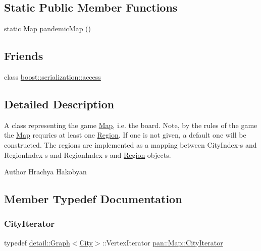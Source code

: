 \subsection*{Static Public Member Functions}
\begin{DoxyCompactItemize}
\item 
static \hyperlink{classpan_1_1_map}{Map} \hyperlink{classpan_1_1_map_afc16b42064eca43b341cd4a555bed092}{pandemic\+Map} ()
\end{DoxyCompactItemize}
\subsection*{Friends}
\begin{DoxyCompactItemize}
\item 
class \hyperlink{classpan_1_1_map_ac98d07dd8f7b70e16ccb9a01abf56b9c}{boost\+::serialization\+::access}
\end{DoxyCompactItemize}


\subsection{Detailed Description}
A class representing the game \hyperlink{classpan_1_1_map}{Map}, i.\+e. the board. Note, by the rules of the game the \hyperlink{classpan_1_1_map}{Map} requries at least one \hyperlink{classpan_1_1_region}{Region}. If one is not given, a default one will be constructed. The regions are implemented as a mapping between City\+Index-\/s and Region\+Index-\/s and Region\+Index-\/s and \hyperlink{classpan_1_1_region}{Region} objects. 

\begin{DoxyAuthor}{Author}
Hrachya Hakobyan 
\end{DoxyAuthor}


\subsection{Member Typedef Documentation}
\mbox{\label{classpan_1_1_map_a13baf12f486c6c3b823696266f06202c}} 
\subsubsection{\texorpdfstring{City\+Iterator}{CityIterator}}
{\footnotesize\ttfamily typedef \hyperlink{classpan_1_1detail_1_1_graph}{detail\+::\+Graph}$<$\hyperlink{classpan_1_1_city}{City}$>$\+::Vertex\+Iterator \hyperlink{classpan_1_1_map_a13baf12f486c6c3b823696266f06202c}{pan\+::\+Map\+::\+City\+Iterator}}

